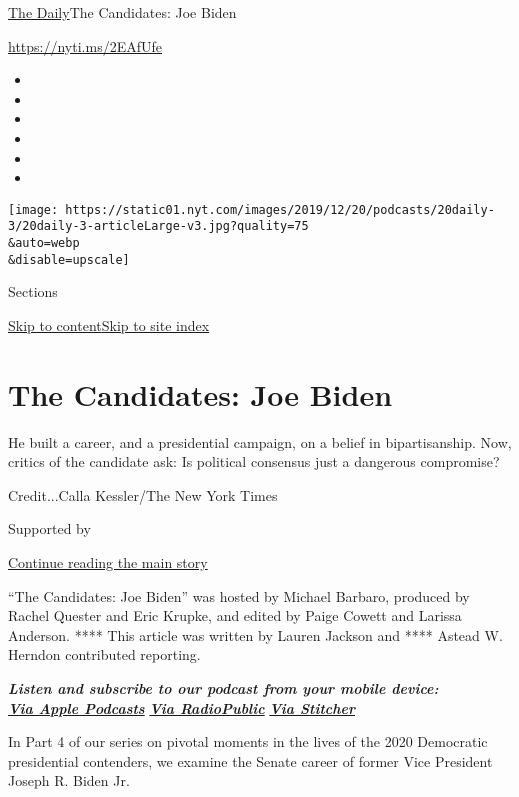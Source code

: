 \href{/podcasts/the-daily}{The Daily}\textbar{}The Candidates: Joe Biden

\url{https://nyti.ms/2EAfUfe}

\begin{itemize}
\item
\item
\item
\item
\item
\item
\end{itemize}

\texttt{[image: https://static01.nyt.com/images/2019/12/20/podcasts/20daily-3/20daily-3-articleLarge-v3.jpg?quality=75\\\&auto=webp\\\&disable=upscale]}

Sections

\protect\hyperlink{site-content}{Skip to
content}\protect\hyperlink{site-index}{Skip to site index}

\hypertarget{the-candidates-joe-biden}{%
\section{The Candidates: Joe Biden}\label{the-candidates-joe-biden}}

He built a career, and a presidential campaign, on a belief in
bipartisanship. Now, critics of the candidate ask: Is political
consensus just a dangerous compromise?

Credit...Calla Kessler/The New York Times

Supported by

\protect\hyperlink{after-sponsor}{Continue reading the main story}

``The Candidates: Joe Biden'' was hosted by Michael Barbaro, produced by
Rachel Quester and Eric Krupke, and edited by Paige Cowett and Larissa
Anderson. **** This article was written by Lauren Jackson and ****
Astead W. Herndon contributed reporting.

\emph{\textbf{Listen and subscribe to our podcast from your mobile
device:}}\\
\textbf{\href{https://itunes.apple.com/us/podcast/the-daily/id1200361736?mt=2}{\emph{Via
Apple Podcasts}}} \emph{\textbf{\textbar{}}}
\textbf{\href{https://play.radiopublic.com/88f7d8c3-7289-4dc6-b300-5ba71b43f5e5}{\emph{Via
RadioPublic}}} \emph{\textbf{\textbar{}}}
\textbf{\href{http://www.stitcher.com/podcast/the-new-york-times/the-daily-10}{\emph{Via
Stitcher}}}

In Part 4 of our series on pivotal moments in the lives of the 2020
Democratic presidential contenders, we examine the Senate career of
former Vice President Joseph R. Biden Jr.

